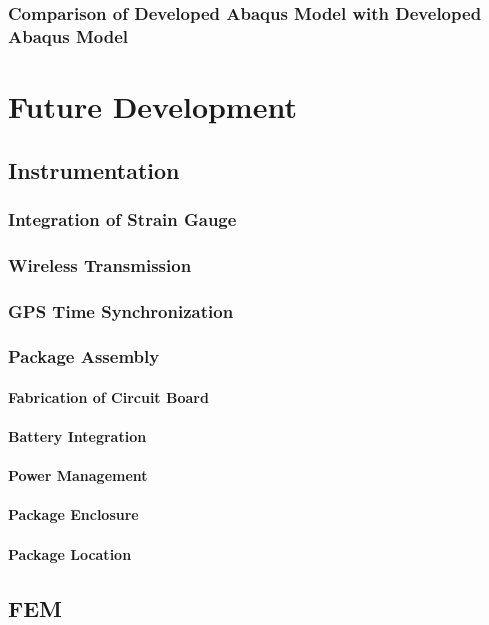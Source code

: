 \documentclass[12pt]{report}
\begin{document}
		\subsection{Comparison of Developed Abaqus Model with Developed Abaqus Model}	
		
\chapter{Future Development}
\label{ch:FutureDevelopment}
	\section{Instrumentation}
		\subsection{Integration of Strain Gauge}
			
		\subsection{Wireless Transmission}
			\label{sec:XBeeFuture}
		\subsection{GPS Time Synchronization}
		\subsection{Package Assembly}
			\subsubsection{Fabrication of Circuit Board}
			\subsubsection{Battery Integration}
			\subsubsection{Power Management}
			\subsubsection{Package Enclosure}
				
			\subsubsection{Package Location}
				
	\section{FEM}
		
		
\end{document}
